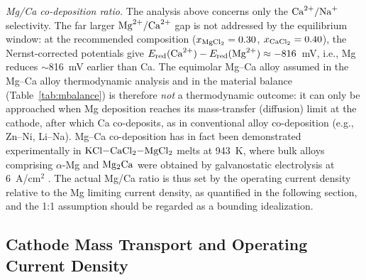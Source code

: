 \documentclass[11pt]{article}
\begin{document}
\emph{Mg/Ca co-deposition ratio.} The analysis above concerns only the $\ce{Ca^{2+}/Na+}$ selectivity. The far larger $\ce{Mg^{2+}/Ca^{2+}}$ gap is not addressed by the equilibrium window: at the recommended composition ($x_{\ce{MgCl2}}=0.30$, $x_{\ce{CaCl2}}=0.40$), the Nernst-corrected potentials give $E_{\mathrm{red}}(\ce{Ca^{2+}}) - E_{\mathrm{red}}(\ce{Mg^{2+}}) \approx -816$~mV, i.e., Mg reduces $\sim$816~mV earlier than Ca. The equimolar Mg--Ca alloy assumed in the Mg--Ca alloy thermodynamic analysis and in the material balance (Table~\ref{tab:mbalance}) is therefore \emph{not} a thermodynamic outcome: it can only be approached when Mg deposition reaches its mass-transfer (diffusion) limit at the cathode, after which Ca co-deposits, as in conventional alloy co-deposition (e.g., Zn--Ni, Li--Na). Mg--Ca co-deposition has in fact been demonstrated experimentally in $\ce{KCl-CaCl2-MgCl2}$ melts at 943~K, where bulk alloys comprising $\alpha$-Mg and $\ce{Mg2Ca}$ were obtained by galvanostatic electrolysis at 6~A/cm$^2$ \cite{tang2015}. The actual Mg/Ca ratio is thus set by the operating current density relative to the Mg limiting current density, as quantified in the following section, and the 1:1 assumption should be regarded as a bounding idealization.

\subsection*{Cathode Mass Transport and Operating Current Density}
\label{subsec:masstransport}
\end{document}
